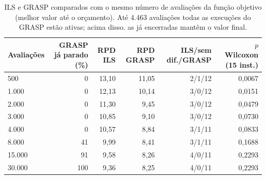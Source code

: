 \begin{table}[t]
\centering
\caption{ILS e GRASP comparados com o mesmo número de avaliações da função objetivo (melhor valor até o orçamento). Até 4.463 avaliações todas as execuções do GRASP estão ativas; acima disso. as já encerradas mantêm o valor final.}
\label{tab:fixedbudget}
\footnotesize
\begin{tabular}{@{}lrrrrr@{}}
\toprule
Avaliações & GRASP já parado (\%) & RPD ILS & RPD GRASP & ILS/sem dif./GRASP & $p$ Wilcoxon (15 inst.) \\
\midrule
500 & 0 & 13,10 & 11,05 & 2/1/12 & 0,0067 \\
1.000 & 0 & 12,13 & 10,14 & 3/0/12 & 0,0151 \\
2.000 & 0 & 11,30 & 9,45 & 3/0/12 & 0,0479 \\
3.000 & 0 & 10,85 & 9,10 & 3/0/12 & 0,0730 \\
4.000 & 0 & 10,57 & 8,84 & 3/1/11 & 0,0833 \\
8.000 & 41 & 9,99 & 8,41 & 3/1/11 & 0,1688 \\
15.000 & 91 & 9,58 & 8,26 & 4/0/11 & 0,2293 \\
30.000 & 100 & 9,36 & 8,25 & 4/0/11 & 0,2293 \\
\bottomrule
\end{tabular}
\end{table}
